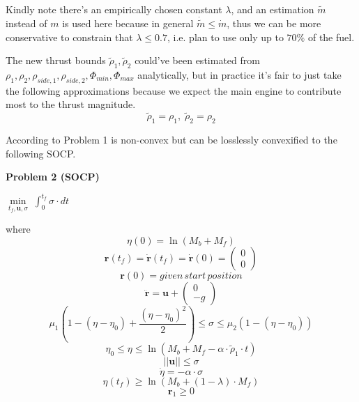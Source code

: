 \documentclass[notitlepage,twocolumn,10pt]{article}
\begin{document}
Kindly note there's an empirically chosen constant $\lambda$, and an estimation $\tilde{m}$ instead of $m$ is used here because in general $\dot{\tilde{m}} \le \dot{m}$, thus we can be more conservative to constrain that $\lambda \le 0.7$, i.e. plan to use only up to $70\%$ of the fuel. 

The new thrust bounds $\tilde{\rho}_1, \tilde{\rho}_2$ could've been estimated from $\rho_1, \rho_2, \rho_{side,1}, \rho_{side,2}, \Phi_{min}, \Phi_{max}$ analytically, but in practice it's fair to just take the following approximations because we expect the main engine to contribute most to the thrust magnitude.
\begin{equation*} \label{eqs:esrhoapprox}
\tilde{\rho}_1 = \rho_1, \; \tilde{\rho}_2 = \rho_2
\end{equation*}


According to \cite{cvxpow, losslesscvx} Problem 1 is non-convex but can be losslessly convexified to the following SOCP\cite{alizadeh2003second}.

\textbf{Problem 2 (SOCP)}

$\underset{t_f, \mathbf{u}, \sigma}{\min} \; \int_{0}^{t_f} \sigma \cdot dt$

where 
\begin{equation}
\eta(0) = \ln(M_{b} + M_{f})
\end{equation}
\begin{equation}
\mathbf{r}(t_f) = \dot{\mathbf{r}}(t_f) = \dot{\mathbf{r}}(0) = \begin{pmatrix} 0 \\ 0 \end{pmatrix}
\end{equation}
\begin{equation}
\mathbf{r}(0) = given \, start \, position
\end{equation}
\begin{equation}
\ddot{\mathbf{r}} = \mathbf{u} + \begin{pmatrix} 0 \\ -g \end{pmatrix}
\end{equation}
\begin{equation} \mu_1 (1-(\eta-\eta_0)+\frac{(\eta-\eta_0)^2}{2}) \le \sigma \le \mu_2 (1-(\eta-\eta_0)) \end{equation}
\begin{equation}
\eta_0 \le \eta \le \ln(M_b + M_f - \alpha \cdot \tilde{\rho}_1 \cdot t)
\end{equation}
\begin{equation} ||\mathbf{u}|| \le \sigma \end{equation}
\begin{equation} \dot{\eta} = -\alpha \cdot \sigma \end{equation}
\begin{equation}
\eta(t_f) \ge \ln(M_b + (1 - \lambda) \cdot M_f)
\end{equation}
\begin{equation} 
\mathbf{r}_1 \ge 0 
\end{equation}
\end{document}
